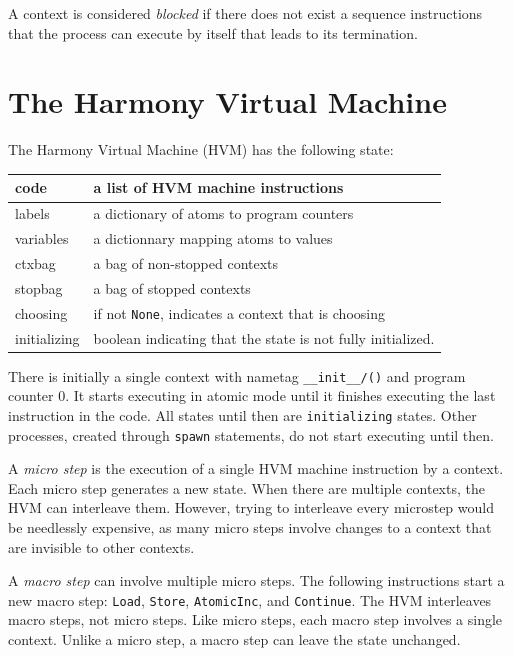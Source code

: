 \documentclass{report}
\begin{document}
A context is considered \emph{blocked}
%
if there does not exist a
sequence instructions that the process can execute by itself
that leads to its termination.

\chapter{The Harmony Virtual Machine}

The Harmony Virtual Machine (HVM) has the following state:

\vspace{1em}
\begin{tabular}{|l|l|}
\hline
code & a list of HVM machine instructions \\
\hline
labels & a dictionary of atoms to program counters \\
\hline
variables & a dictionnary mapping atoms to values \\
\hline
ctxbag & a bag of non-stopped contexts \\
\hline
stopbag & a bag of stopped contexts \\
\hline
choosing & if not \texttt{None}, indicates a context that is choosing \\
\hline
initializing & boolean indicating that the state is not fully initialized. \\
\hline
\end{tabular}
\vspace{1em}

There is initially a single context with nametag
\texttt{\_\_init\_\_/()} and program counter 0.  It starts executing
in atomic mode until it finishes executing the last instruction in
the code.  All states until then are \texttt{initializing} states.
Other processes, created through \texttt{spawn} statements, do not
start executing until then.

A \emph{micro step}
is the execution of a single HVM machine instruction
by a context.
Each micro step generates a new state.
When there are multiple contexts, the HVM can interleave them.
However, trying to interleave every microstep would be needlessly expensive,
as many micro steps involve changes to a context that are invisible to
other contexts.

A \emph{macro step}
%
can involve multiple micro steps.  The following
instructions start a new macro step: \texttt{Load}, \texttt{Store},
\texttt{AtomicInc}, and \texttt{Continue}.  The HVM
interleaves macro steps, not micro steps.  Like micro steps, each
macro step involves a single context.  Unlike a micro step, a macro
step can leave the state unchanged.
\end{document}
